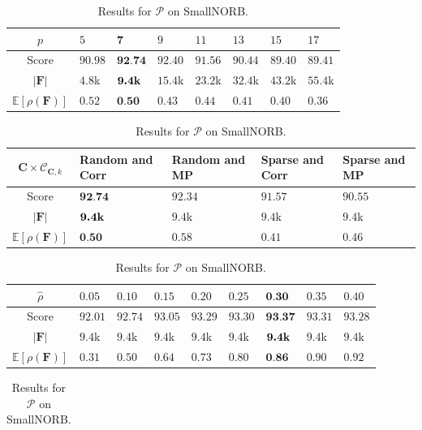 \documentclass[12pt,a4paper,oneside,english]{UPBThesis}
\newcommand{\hctimes}[2]{{#1}\!\times\!{#2}}
\begin{document}
\renewcommand{\arraystretch}{1.2}
\begin{table}
  \caption{Results for $p$ on SmallNORB.}
  \label{table:RecoderEvNORBSmallp}
  \begin{tabularx}{\textwidth}{|c|RRRRRRR|}
    \hline
    $p$ & $5$ & $\textbf{7}$ & $9$ & $11$ & $13$ & $15$ & $17$ \tabularnewline\hline\hline
    Score & $90.98$ & $\textbf{92.74}$ & $92.40$ & $91.56$ & $90.44$ & $89.40$ & $89.41$ \tabularnewline
    $\left|\textbf{F}\right|$ & $4.8$k & $\textbf{9.4\mbox{k}}$ & $15.4$k & $23.2$k & $32.4$k & $43.2$k & $55.4$k \tabularnewline
    $\mathbb{E}[\rho(\textbf{F})]$ & $0.52$ & $\textbf{0.50}$ & $0.43$ & $0.44$ & $0.41$ & $0.40$ & $0.36$ \tabularnewline
    \hline
  \end{tabularx}
  \caption{Results for $\hctimes{\textbf{C}}{\mathcal{C}_{\textbf{C},k}}$ on SmallNORB.}
  \label{table:RecoderEvNORBSmallCCCk}
  \begin{tabularx}{\textwidth}{|c|RRRR|}
    \hline
    $\hctimes{\textbf{C}}{\mathcal{C}_{\textbf{C},k}}$ & \textbf{Random and Corr} & Random and \textbf{MP} & Sparse and \textbf{Corr} & Sparse and \textbf{MP} \tabularnewline\hline\hline
    Score & $\textbf{92.74}$ & $92.34$ & $91.57$ & $90.55$ \tabularnewline
    $\left|\textbf{F}\right|$ & $\textbf{9.4\mbox{k}}$ & $9.4$k & $9.4$k & $9.4$k \tabularnewline
    $\mathbb{E}[\rho(\textbf{F})]$ & $\textbf{0.50}$ & $0.58$ & $0.41$ & $0.46$ \tabularnewline
    \hline
  \end{tabularx}
  \caption{Results for $\hat{\rho}$ on SmallNORB.}
  \label{table:RecoderEvNORBSmallrho}
  \begin{tabularx}{\textwidth}{|c|RRRRRRRR|}
    \hline
    $\hat{\rho}$ & $0.05$ & $0.10$ & $0.15$ & $0.20$ & $0.25$ & $\textbf{0.30}$ & $0.35$ & $0.40$ \tabularnewline\hline\hline
    Score & $92.01$ & $92.74$ & $93.05$ & $93.29$ & $93.30$ & $\textbf{93.37}$ & $93.31$ & $93.28$ \tabularnewline
    $\left|\textbf{F}\right|$ & $9.4$k & $9.4$k & $9.4$k & $9.4$k & $9.4$k & $\textbf{9.4\mbox{k}}$ & $9.4$k & $9.4$k \tabularnewline
    $\mathbb{E}[\rho(\textbf{F})]$ & $0.31$ & $0.50$ & $0.64$ & $0.73$ & $0.80$ & $\textbf{0.86}$ & $0.90$ & $0.92$ \tabularnewline
    \hline
  \end{tabularx}
  \caption{Results for $\mathcal{P}$ on SmallNORB.}
  \label{table:RecoderEvNORBSmallP}
  \begin{tabularx}{\textwidth}{|c|RRR|}
    \hline

\end{tabularx}
\end{table}
\end{document}
